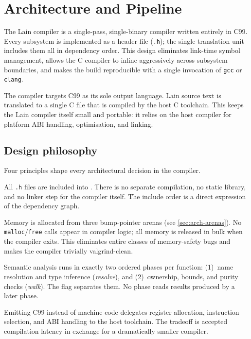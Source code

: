 \chapter{Architecture and Pipeline}
\label{chap:01-architecture}

\pnum
The Lain compiler is a single-pass, single-binary compiler written entirely in C99.
Every subsystem is implemented as a header file (\texttt{.h}); the single translation
unit  includes them all in dependency order.  This design eliminates
link-time symbol management, allows the C compiler to inline aggressively across
subsystem boundaries, and makes the build reproducible with a single invocation of
\texttt{gcc} or \texttt{clang}.

\pnum
The compiler targets C99 as its sole output language.  Lain source text is translated
to a single C file that is compiled by the host C toolchain.  This keeps the Lain
compiler itself small and portable: it relies on the host compiler for platform ABI
handling, optimisation, and linking.

\section{Design philosophy}
\label{sec:arch-philosophy}

\pnum
Four principles shape every architectural decision in the compiler.

\begin{description}[leftmargin=2cm, style=nextline]
\item[Single translation unit.]
  All \texttt{.h} files are included into .  There is no
  separate compilation, no static library, and no linker step for the compiler
  itself.  The include order is a direct expression of the dependency graph.
\item[Three arenas, zero free.]
  Memory is allocated from three bump-pointer arenas (see \cref{sec:arch-arenas}).
  No \texttt{malloc}/\texttt{free} calls appear in compiler logic; all memory is
  released in bulk when the compiler exits.  This eliminates entire classes of
  memory-safety bugs and makes the compiler trivially valgrind-clean.
\item[Two semantic phases, one pass each.]
  Semantic analysis runs in exactly two ordered phases per function: (1)~name
  resolution and type inference (\textit{resolve}), and (2)~ownership, bounds,
  and purity checks (\textit{walk}).  The flag  separates
  them.  No phase reads results produced by a later phase.
\item[C99 backend.]
  Emitting C99 instead of machine code delegates register allocation, instruction
  selection, and ABI handling to the host toolchain.  The tradeoff is accepted
  compilation latency in exchange for a dramatically smaller compiler.
\end{description}


